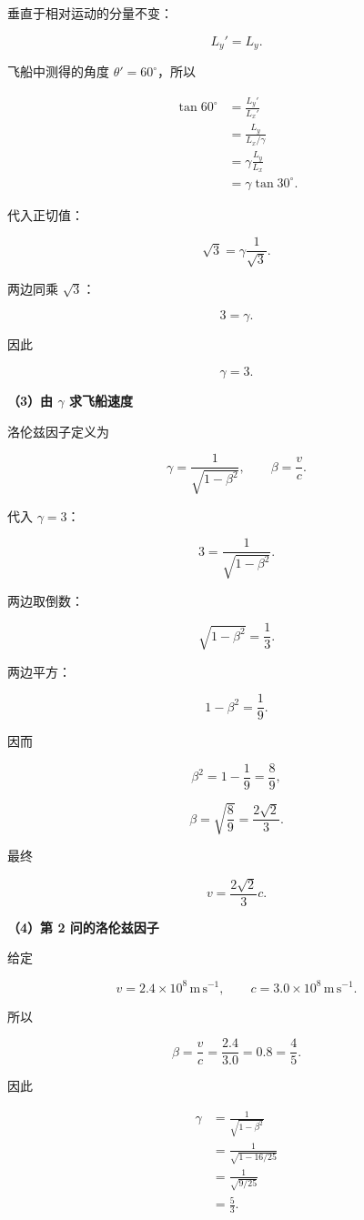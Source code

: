 \documentclass[12pt,a4paper,UTF8]{ctexart}
\begin{document}
垂直于相对运动的分量不变：

\[
L_y'=L_y.
\]

飞船中测得的角度 \(\theta'=60^\circ\)，所以

\[
\begin{aligned}
\tan60^\circ
&=\frac{L_y'}{L_x'}\\
&=\frac{L_y}{L_x/\gamma}\\
&=\gamma\frac{L_y}{L_x}\\
&=\gamma\tan30^\circ.
\end{aligned}
\]

代入正切值：

\[
\sqrt3=\gamma\frac1{\sqrt3}.
\]

两边同乘 \(\sqrt3\)：

\[
3=\gamma.
\]

因此

\[
\boxed{\gamma=3}.
\]

\textbf{（3）由 \(\gamma\) 求飞船速度}

洛伦兹因子定义为

\[
\gamma=\frac1{\sqrt{1-\beta^2}},
\qquad
\beta=\frac vc.
\]

代入 \(\gamma=3\)：

\[
3=\frac1{\sqrt{1-\beta^2}}.
\]

两边取倒数：

\[
\sqrt{1-\beta^2}=\frac13.
\]

两边平方：

\[
1-\beta^2=\frac19.
\]

因而

\[
\beta^2=1-\frac19=\frac89,
\]

\[
\beta=\sqrt{\frac89}=\frac{2\sqrt2}{3}.
\]

最终

\[
\boxed{v=\frac{2\sqrt2}{3}c}.
\]

\textbf{（4）第 2 问的洛伦兹因子}

给定

\[
v=2.4\times10^8\,\mathrm{m\,s^{-1}},
\qquad
c=3.0\times10^8\,\mathrm{m\,s^{-1}}.
\]

所以

\[
\beta=\frac vc=\frac{2.4}{3.0}=0.8=\frac45.
\]

因此

\[
\begin{aligned}
\gamma
&=\frac1{\sqrt{1-\beta^2}}\\
&=\frac1{\sqrt{1-16/25}}\\
&=\frac1{\sqrt{9/25}}\\
&=\frac53.
\end{aligned}
\]
\end{document}
